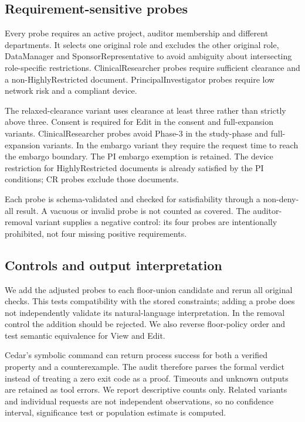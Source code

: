 \documentclass[sigconf,nonacm]{acmart}
\begin{document}
\subsection{Requirement-sensitive probes}
Every probe requires an active project, auditor membership and different departments. It selects one original role and excludes the other original role, DataManager and SponsorRepresentative to avoid ambiguity about intersecting role-specific restrictions. ClinicalResearcher probes require sufficient clearance and a non-HighlyRestricted document. PrincipalInvestigator probes require low network risk and a compliant device.

The relaxed-clearance variant uses clearance at least three rather than strictly above three. Consent is required for Edit in the consent and full-expansion variants. ClinicalResearcher probes avoid Phase-3 in the study-phase and full-expansion variants. In the embargo variant they require the request time to reach the embargo boundary. The PI embargo exemption is retained. The device restriction for HighlyRestricted documents is already satisfied by the PI conditions; CR probes exclude those documents.

Each probe is schema-validated and checked for satisfiability through a non-deny-all result. A vacuous or invalid probe is not counted as covered. The auditor-removal variant supplies a negative control: its four probes are intentionally prohibited, not four missing positive requirements.

\subsection{Controls and output interpretation}
We add the adjusted probes to each floor-union candidate and rerun all original checks. This tests compatibility with the stored constraints; adding a probe does not independently validate its natural-language interpretation. In the removal control the addition should be rejected. We also reverse floor-policy order and test semantic equivalence for View and Edit.

Cedar's symbolic command can return process success for both a verified property and a counterexample. The audit therefore parses the formal verdict instead of treating a zero exit code as a proof. Timeouts and unknown outputs are retained as tool errors. We report descriptive counts only. Related variants and individual requests are not independent observations, so no confidence interval, significance test or population estimate is computed.
\end{document}
